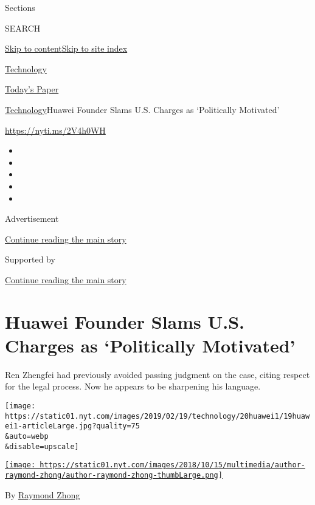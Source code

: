 Sections

SEARCH

\protect\hyperlink{site-content}{Skip to
content}\protect\hyperlink{site-index}{Skip to site index}

\href{https://www.nytimes.com/section/technology}{Technology}

\href{https://myaccount.nytimes.com/auth/login?response_type=cookie\&client_id=vi}{}

\href{https://www.nytimes.com/section/todayspaper}{Today's Paper}

\href{/section/technology}{Technology}\textbar{}Huawei Founder Slams
U.S. Charges as `Politically Motivated'

\url{https://nyti.ms/2V4h0WH}

\begin{itemize}
\item
\item
\item
\item
\item
\end{itemize}

Advertisement

\protect\hyperlink{after-top}{Continue reading the main story}

Supported by

\protect\hyperlink{after-sponsor}{Continue reading the main story}

\hypertarget{huawei-founder-slams-us-charges-as-politically-motivated}{%
\section{Huawei Founder Slams U.S. Charges as `Politically
Motivated'}\label{huawei-founder-slams-us-charges-as-politically-motivated}}

Ren Zhengfei had previously avoided passing judgment on the case, citing
respect for the legal process. Now he appears to be sharpening his
language.

\texttt{[image: https://static01.nyt.com/images/2019/02/19/technology/20huawei1/19huawei1-articleLarge.jpg?quality=75\\\&auto=webp\\\&disable=upscale]}

\href{https://www.nytimes.com/by/raymond-zhong}{\texttt{[image: https://static01.nyt.com/images/2018/10/15/multimedia/author-raymond-zhong/author-raymond-zhong-thumbLarge.png]}}

By \href{https://www.nytimes.com/by/raymond-zhong}{Raymond Zhong}

